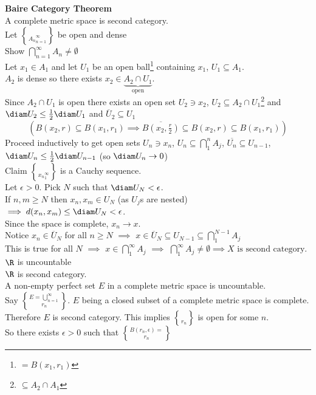 \textbf{Baire Category Theorem} \\
A complete metric space is second category. \\
\pf Let $\brace{A_n}_{n=1}^\infty$ be open and dense \\
Show $\bigcap_{n=1}^\infty A_n\neq\emptyset$ \\
Let $x_1\in A_1$ and let $U_1$ be an open ball\footnote{$=B(x_1,r_1)$} containing $x_1$, $U_1\subseteq A_1$. \\
$A_2$ is dense so there exists $x_2\in \underbrace{A_2\cap U_1}_\text{open}$. \\
Since $A_2\cap U_1$ is open there exists an open set $U_2\ni x_2$, $U_2\subseteq A_2\cap U_1$\footnote{$\subseteq A_2\cap A_1$} and $\diam U_2\leq\frac12\diam U_1$ and $\overline U_2 \subseteq U_1$
\[ ( B(x_2,r) \subseteq B(x_1,r_1) \implies \overline{B(x_2,\tfrac{r}{2})} \subseteq B(x_2,r) \subseteq B(x_1,r_1) ) \]
Proceed inductively to get open sets $U_n\ni x_n$, $U_n\subseteq\bigcap_1^n A_j$, $\overline{U_n}\subseteq U_{n-1}$, $\diam U_n\leq\frac12\diam U_{n-1}$ (so $\diam U_n\to0$) \\
Claim $\brace{x_n}_1^\infty$ is a Cauchy sequence. \\
Let $\epsilon>0$.  Pick $N$ such that $\diam U_N<\epsilon$. \\
If $n,m\geq N$ then $x_n,x_m\in U_N$ (as $U_j$s are nested) \\
$\implies d(x_n,x_m)\leq\diam U_N<\epsilon$. \\
Since the space is complete, $x_n\to x$. \\
Notice $x_n\in\overline U_N$ for all $n\geq N$ $\implies$ $x\in\overline U_N \subseteq U_{N-1} \subseteq \bigcap_1^{N-1} A_j$ \\
This is true for all $N$ $\implies$ $x\in\bigcap_1^\infty A_j$ $\implies$ $\bigcap_1^\infty A_j \neq \emptyset \implies \text{$X$ is second category}$. \\
\cor $\R$ is uncountable \\
\pf $\R$ is second category. \\
\cor A non-empty perfect set $E$ in a complete metric space is uncountable. \\
\pf Say $E=\bigcup_{n=1}^\infty\brace{r_n}$.  $E$ being a closed subset of a complete metric space is complete.  Therefore $E$ is second category.  This implies $\brace{r_n}$ is open for some $n$. \\
So there exists $\epsilon>0$ such that $B(r_n,\epsilon)=\brace{r_n}$ \\
